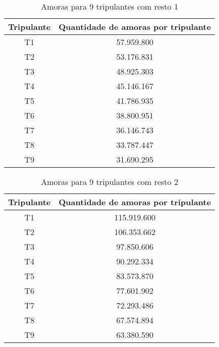 \documentclass[12pt]{article}
\begin{document}
\begin{table}[H]

\centering

\begin{tabular}{|c|c|}

\hline
Tripulante & Quantidade de amoras por tripulante \\
\hline
T1 & 57.959.800 \\
\hline
T2 & 53.176.831 \\
\hline
T3 & 48.925.303 \\
\hline
T4 & 45.146.167 \\
\hline
T5 & 41.786.935 \\
\hline
T6 & 38.800.951 \\
\hline
T7 & 36.146.743 \\
\hline
T8 & 33.787.447 \\
\hline
T9 & 31.690.295 \\
\hline

\end{tabular}
\label{Tabela11}
\caption{Amoras para 9 tripulantes com resto 1}

\end{table}
\begin{table}[H]

\centering

\begin{tabular}{|c|c|}

\hline
Tripulante & Quantidade de amoras por tripulante \\
\hline
T1 & 115.919.600 \\
\hline
T2 & 106.353.662 \\
\hline
T3 & 97.850.606 \\
\hline
T4 & 90.292.334 \\
\hline
T5 & 83.573.870 \\
\hline
T6 & 77.601.902 \\
\hline
T7 & 72.293.486 \\
\hline
T8 & 67.574.894 \\
\hline
T9 & 63.380.590 \\
\hline

\end{tabular}
\label{Tabela12}
\caption{Amoras para 9 tripulantes com resto 2}

\end{table}
\end{document}
